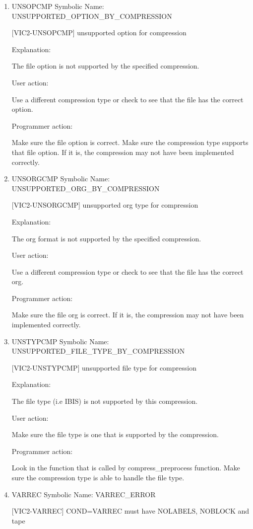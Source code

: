 \begin{enumerate}
\item UNSOPCMP Symbolic Name: UNSUPPORTED\_OPTION\_BY\_COMPRESSION

[VIC2-UNSOPCMP] unsupported option for compression

Explanation:

The file option is not supported by the specified compression.

User action:

Use a different compression type or check to see that the file has
the correct option.

Programmer action:

Make sure the file option is correct.  Make sure the compression
type supports that file option.  If it is, the compression
may not have been implemented correctly.


\item UNSORGCMP Symbolic Name: UNSUPPORTED\_ORG\_BY\_COMPRESSION

[VIC2-UNSORGCMP] unsupported org type for compression

Explanation:

The org format is not supported by the specified compression.

User action:

Use a different compression type or check to see that the file has
the correct org.

Programmer action:

Make sure the file org is correct.  If it is, the compression
may not have been implemented correctly.


\item UNSTYPCMP Symbolic Name: UNSUPPORTED\_FILE\_TYPE\_BY\_COMPRESSION

[VIC2-UNSTYPCMP] unsupported file type for compression

Explanation:

The file type (i.e IBIS) is not supported by this compression.

User action:

Make sure the file type is one that is supported by the compression.

Programmer action:

Look in the function that is called by compress\_preprocess 
function.  Make sure the compression type is able to handle
the file type.

\item VARREC Symbolic Name: VARREC\_ERROR

[VIC2-VARREC] COND=VARREC must have NOLABELS, NOBLOCK and tape


\end{enumerate}
